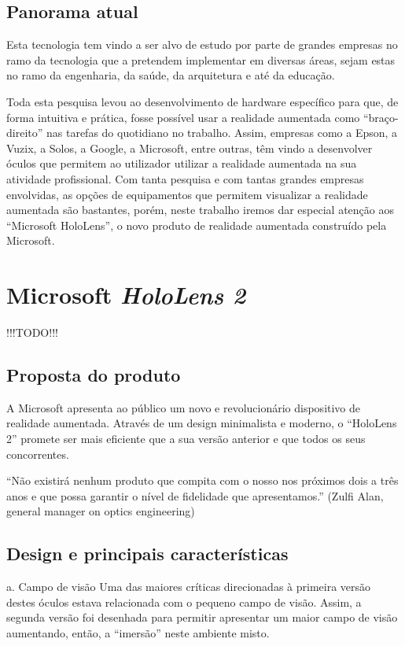 \documentclass{report}
\begin{document}
\section{Panorama atual}
Esta tecnologia tem vindo a ser alvo de estudo por parte de grandes empresas no ramo da tecnologia que a pretendem implementar em diversas áreas, sejam estas no ramo da engenharia, da saúde, da arquitetura e até da educação.

Toda esta pesquisa levou ao desenvolvimento de hardware específico para que, de forma intuitiva e prática, fosse possível usar a realidade aumentada como “braço-direito” nas tarefas do quotidiano no trabalho. Assim, empresas como a Epson, a Vuzix, a Solos, a Google, a Microsoft, entre outras, têm vindo a desenvolver óculos que permitem ao utilizador utilizar a realidade aumentada na sua atividade profissional. Com tanta pesquisa e com tantas grandes empresas envolvidas, as opções de equipamentos que permitem visualizar a realidade aumentada são bastantes, porém, neste trabalho iremos dar especial atenção aos “Microsoft HoloLens”, o novo produto de realidade aumentada construído pela Microsoft.

\chapter{Microsoft \textit{HoloLens 2}}
\label{chap.microsoft-hololens-2}
!!!TODO!!!

\section{Proposta do produto}
A Microsoft apresenta ao público um novo e revolucionário dispositivo de realidade aumentada. Através de um design minimalista e moderno, o “HoloLens 2” promete ser mais eficiente que a sua versão anterior e que todos os seus concorrentes.

“Não existirá nenhum produto que compita com o nosso nos próximos dois a três anos e que possa garantir o nível de fidelidade que apresentamos.” (Zulfi Alan, general manager on optics engineering)

\section{Design e principais características}
a. Campo de visão
Uma das maiores críticas direcionadas à primeira versão destes óculos estava relacionada com o pequeno campo de visão. Assim, a segunda versão foi desenhada para permitir apresentar um maior campo de visão aumentando, então, a “imersão” neste ambiente misto.
\end{document}
